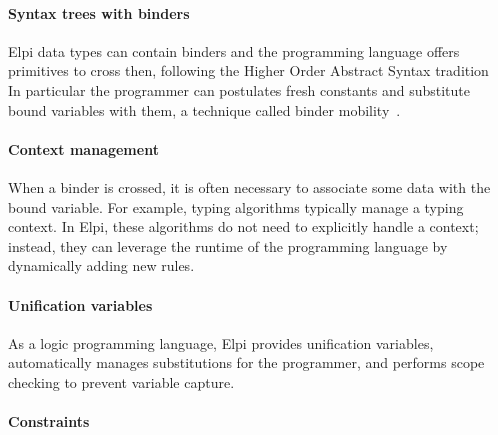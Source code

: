 \documentclass[sigplan,natbib=false]{acmart}
\begin{document}
\paragraph{Syntax trees with binders}
Elpi data types can contain binders and the programming
language offers primitives to cross then, following the Higher Order Abstract
Syntax tradition~\cite{10.1145/960116.54010}
In particular the programmer can
postulates fresh constants and substitute bound variables with them,
a technique called binder mobility~\cite{miller:hal-01884210}.

\paragraph{Context management}

When a binder is crossed, it is often necessary to associate some data with the
bound variable. For example, typing algorithms typically manage a typing
context. In Elpi, these algorithms do not need to explicitly handle a context;
instead, they can leverage the runtime of the programming language by
dynamically adding new rules.

\paragraph{Unification variables}

As a logic programming language, Elpi provides unification variables,
automatically manages substitutions for the programmer, and performs scope
checking to prevent variable capture.

\paragraph{Constraints}
\end{document}
